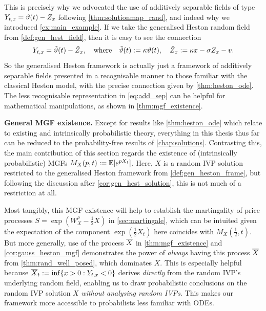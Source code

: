 This is precisely why we advocated the use of additively separable fields of type $Y_{t,x}=\vartheta(t)-Z_x$ following \autoref{thm:solutionmap_rand}, and indeed why we introduced \autoref{ex:main_example}. If we take the generalised Heston random field from \autoref{def:gen_hest_field}, then it is easy to see the connection~
\begin{equation}\label{eq:add_sep}
    Y_{t,x} = \tilde{\vartheta}(t) - \tilde Z_x,\quad\text{where}\quad \tilde{\vartheta}(t):=\kappa\vartheta(t),\quad \tilde Z_x:=\kappa x - \sigma Z_x - v.
\end{equation}
So the generalised Heston framework is actually just a framework of additively separable fields presented in a recognisable manner to those familiar with the classical Heston model, with the precise connection given by \autoref{thm:heston_ode}. The less recognisable representation in \autoref{eq:add_sep} can be helpful for mathematical manipulations, as shown in \autoref{thm:mgf_existence}.

\vspace{3mm}\textbf{General MGF existence.} Except for results like \autoref{thm:heston_ode} which relate to existing and intrinsically probabilistic theory, everything in this thesis thus far can be reduced to the probability-free results of \autoref{chap:solutions}. Contrasting this, the main contribution of this section regards the existence of (intrinsically probabilistic) MGFs $M_X(p,t):=\mathbb{E}[e^{pX_t}]$. Here, $X$ is a random IVP solution restricted to the generalised Heston framework from \autoref{def:gen_heston_frame}, but following the discussion after \autoref{cor:gen_hest_solution}, this is not much of a restriction at all.

Most tangibly, this MGF existence will help to establish the martingality of price processes $S=\exp(W^\rho_X-\frac12 X)$ in \autoref{sec:martingale}, which can be intuited given the expectation of the component $\exp(\frac12 X_t)$ here coincides with $M_X(\frac12,t)$. But more generally, use of the process ${\overline{X}}$ in \autoref{thm:mgf_existence} and \autoref{cor:gauss_heston_mgf} demonstrates the power of \emph{always} having this process ${\overline{X}}$ from \autoref{thm:rand_well_posed}, which dominates $X$. This is especially helpful because ${\overline{X}}_t:=\inf\{x>0:Y_{t,x}<0\}$ derives \emph{directly} from the random IVP's underlying random field, enabling us to draw probabilistic conclusions on the random IVP solution $X$ \emph{without analysing random IVPs}. This makes our framework more accessible to probabilists less familiar with ODEs.

